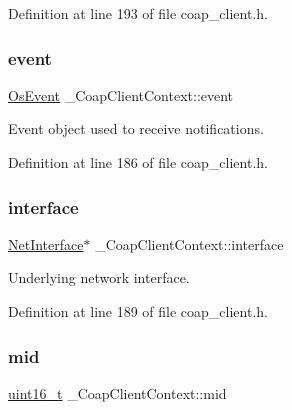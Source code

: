 Definition at line 193 of file coap\+\_\+client.\+h.

\mbox{\label{struct__CoapClientContext_a3210ea687fa301c529cdab6875b1eeec}} 
\subsubsection{\texorpdfstring{event}{event}}
{\footnotesize\ttfamily \hyperlink{structOsEvent}{Os\+Event} \+\_\+\+Coap\+Client\+Context\+::event}



Event object used to receive notifications. 



Definition at line 186 of file coap\+\_\+client.\+h.

\mbox{\label{struct__CoapClientContext_af8ce2c2d8b0d9dca4b6cca02393e3984}} 
\subsubsection{\texorpdfstring{interface}{interface}}
{\footnotesize\ttfamily \hyperlink{net_8h_a2234db8911a1148c9159979d8f5e0d6b}{Net\+Interface}$\ast$ \+\_\+\+Coap\+Client\+Context\+::interface}



Underlying network interface. 



Definition at line 189 of file coap\+\_\+client.\+h.

\mbox{\label{struct__CoapClientContext_a53902f5a9b21d87bf6cc89c07bb88e3a}} 
\subsubsection{\texorpdfstring{mid}{mid}}
{\footnotesize\ttfamily \hyperlink{stdint_8h_a273cf69d639a59973b6019625df33e30}{uint16\+\_\+t} \+\_\+\+Coap\+Client\+Context\+::mid}



